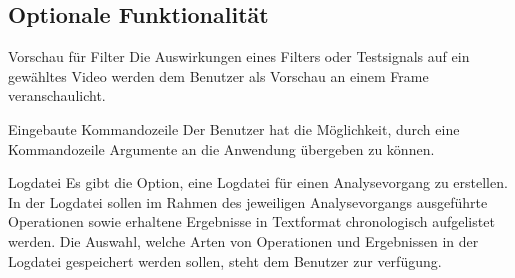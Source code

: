 \subsection{Optionale Funktionalität}

 Vorschau für Filter
\newline
Die Auswirkungen eines Filters oder Testsignals auf ein gewähltes Video werden dem Benutzer als Vorschau an einem Frame veranschaulicht.


 Eingebaute Kommandozeile
\newline
Der Benutzer hat die Möglichkeit, durch eine Kommandozeile Argumente an die Anwendung übergeben zu können.

 Logdatei
\newline
Es gibt die Option, eine Logdatei für einen Analysevorgang zu erstellen. In der Logdatei sollen im Rahmen des jeweiligen Analysevorgangs ausgeführte Operationen sowie erhaltene Ergebnisse in Textformat chronologisch aufgelistet werden. Die Auswahl, welche Arten von Operationen und Ergebnissen in der Logdatei gespeichert werden sollen, steht dem Benutzer zur verfügung.
